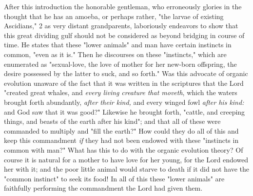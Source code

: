After this introduction the honorable gentleman, who erroneously glories in the thought that
he has an amoeba, or perhaps rather, "the larvae of existing Ascidians," 2 as very distant
grandparents, laboriously endeavors to show that this great dividing gulf should not be
considered as beyond bridging in course of time. He states that these "lower animals" and
man have certain instincts in common, "even as it is." Then he discourses on these
"instincts," which are enumerated as "sexual-love, the love of mother for her new-born
offspring, the desire possessed by the latter to suck, and so forth." Was this advocate of
organic evolution unaware of the fact that it was written in the scriptures that the Lord
"created great whales, and \textit{every living creature that moveth}, which the waters brought forth
abundantly, \textit{after their kind,} and every winged fowl \textit{after his kind:} and God saw that it was
good?" Likewise he brought forth, "cattle, and creeping things, and beasts of the earth after
his kind"; and that all of these were commanded to multiply and "fill the earth?" How could
they do all of this and keep this commandment \textit{if} they had not been endowed with these
"instincts in common with man?" What has this to do with the organic evolution theory? Of
course it is natural for a mother to have love for her young, for the Lord endowed her with it;
and the poor little animal would starve to death if it did not have the "common instinct" to
seek its food! In all of this these "lower animals" are faithfully performing the commandment
the Lord had given them.

